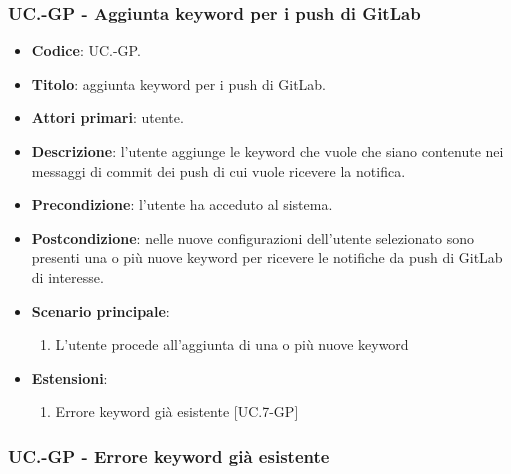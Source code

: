 	\subsubsection{UC\theuccount.\thesubuccount-GP - Aggiunta keyword per i push di GitLab}
		
		\begin{itemize}
			\item \textbf{Codice}: UC\theuccount.\thesubuccount-GP.
			\item \textbf{Titolo}: aggiunta keyword per i push di GitLab.
			\item \textbf{Attori primari}: utente.
			\item \textbf{Descrizione}: l’utente aggiunge le keyword che vuole che siano contenute nei messaggi di commit dei push di cui vuole ricevere la notifica.
			\item \textbf{Precondizione}: l’utente ha acceduto al sistema.
			\item \textbf{Postcondizione}: nelle nuove configurazioni dell'utente selezionato sono presenti una o più nuove keyword per ricevere le notifiche da push di GitLab di interesse.
			\item \textbf{Scenario principale}:
			\begin{enumerate}
				\item L'utente procede all'aggiunta di una o più nuove keyword
			\end{enumerate}
			\item \textbf{Estensioni}:
			\begin{enumerate}
				\item Errore keyword già esistente [UC\theuccount.7-GP]
			\end{enumerate}
		\end{itemize}
	
	\subsubsection{UC\theuccount.\thesubuccount-GP - Errore keyword già esistente}
	
